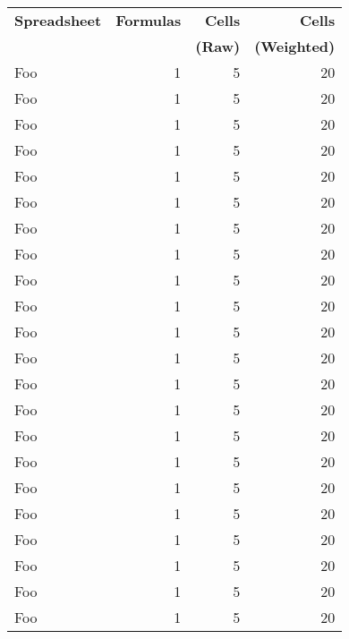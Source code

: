 \begin{table}[t!]
  \centering
    \begin{tabular}{l|rrr}
      \textsf{\bf{Spreadsheet}} & \textsf{\bf{Formulas}} & \textsf{\bf{Cells}} & \textsf{\bf{Cells}} \\
                                &                        & \textsf{\bf{(Raw)}} & \textsf{\bf{(Weighted)}} \\
    \hline
    \textsf{Foo} & \textsf{1} & \textsf{5}  & \textsf{20} \\
    \textsf{Foo} & \textsf{1} & \textsf{5}  & \textsf{20} \\
    \textsf{Foo} & \textsf{1} & \textsf{5}  & \textsf{20} \\
    \textsf{Foo} & \textsf{1} & \textsf{5}  & \textsf{20} \\
    \textsf{Foo} & \textsf{1} & \textsf{5}  & \textsf{20} \\
    \textsf{Foo} & \textsf{1} & \textsf{5}  & \textsf{20} \\
    \textsf{Foo} & \textsf{1} & \textsf{5}  & \textsf{20} \\
    \textsf{Foo} & \textsf{1} & \textsf{5}  & \textsf{20} \\
    \textsf{Foo} & \textsf{1} & \textsf{5}  & \textsf{20} \\
    \textsf{Foo} & \textsf{1} & \textsf{5}  & \textsf{20} \\
    \textsf{Foo} & \textsf{1} & \textsf{5}  & \textsf{20} \\
    \textsf{Foo} & \textsf{1} & \textsf{5}  & \textsf{20} \\
    \textsf{Foo} & \textsf{1} & \textsf{5}  & \textsf{20} \\
    \textsf{Foo} & \textsf{1} & \textsf{5}  & \textsf{20} \\
    \textsf{Foo} & \textsf{1} & \textsf{5}  & \textsf{20} \\
    \textsf{Foo} & \textsf{1} & \textsf{5}  & \textsf{20} \\
    \textsf{Foo} & \textsf{1} & \textsf{5}  & \textsf{20} \\
    \textsf{Foo} & \textsf{1} & \textsf{5}  & \textsf{20} \\
    \textsf{Foo} & \textsf{1} & \textsf{5}  & \textsf{20} \\
    \textsf{Foo} & \textsf{1} & \textsf{5}  & \textsf{20} \\
    \textsf{Foo} & \textsf{1} & \textsf{5}  & \textsf{20} \\
    \textsf{Foo} & \textsf{1} & \textsf{5}  & \textsf{20} \\

\end{tabular}
\end{table}
